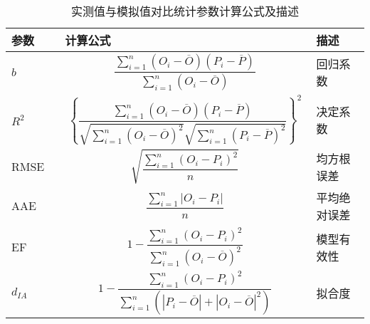 \begin{table}
    \caption{实测值与模拟值对比统计参数计算公式及描述}
    \begin{tabular}{p{0.15\linewidth}p{0.7\linewidth}p{0.15\linewidth}}
        \toprule
        参数     & 计算公式                                                                                                                                                                      & 描述         \\
        \midrule
        $b$      & $$\frac{\sum_{i=1}^n (O_i - \overline{O}) (P_i - \overline{P})}{\sum_{i=1}^n (O_i - \overline{O})}$$                                                                          & 回归系数     \\
        $R^2$    & $$\left \{ \frac{\sum_{i=1}^n (O_i - \overline{O}) (P_i - \overline{P})}{\sqrt{\sum_{i=1}^n (O_i - \overline{O})^2} \sqrt{\sum_{i=1}^n (P_i - \overline{P})^2}} \right \}^2$$ & 决定系数     \\
        RMSE     & $$\sqrt{\frac{\sum_{i=1}^n (O_i - P_i)^2}{n}}$$                                                                                                                               & 均方根误差   \\
        AAE      & $$\frac{\sum_{i=1}^n |O_i - P_i|}{n}$$                                                                                                                                        & 平均绝对误差 \\
        EF       & $$1 - \frac{\sum_{i=1}^n (O_i - P_i)^2}{\sum_{i=1}^n (O_i - \overline{O})^2}$$                                                                                                & 模型有效性   \\
        $d_{IA}$ & $$1 - \frac{\sum_{i=1}^n (O_i - P_i)^2}{\sum_{i=1}^n (|P_i - \overline{O}| + |O_i - \overline{O}|^2)}$$                                                                         & 拟合度       \\
        \bottomrule
    \end{tabular}
\end{table}


